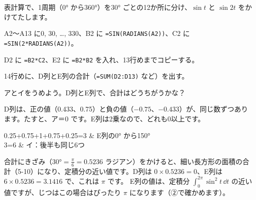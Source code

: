 \begin{yattemiyou}
表計算で、1周期（0° から360°）を30° ごとの12か所に分け、$\sin t$ と $\sin2t$ をかけてたします。
\begin{enumerate}[label={\bkcircled[bkGreen]{\arabic*}}, leftmargin=2.4\zw, itemsep=0pt, topsep=2pt]
\item A2〜A13 に0, 30, …, 330、B2 に \texttt{=SIN(RADIANS(A2))}、C2 に \texttt{=SIN(2*RADIANS(A2))}。
\item D2 に \texttt{=B2*C2}、E2 に \texttt{=B2*B2} を入れ、13行めまでコピーする。
\item 14行めに、D列とE列の合計（\texttt{=SUM(D2:D13)} など）を出す。
\end{enumerate}
\begin{bkcenter}
\end{bkcenter}
アとイをうめよう。D列とE列で、合計はどうちがうかな？
\end{yattemiyou}

\noindent D列は、正の値（0.433、0.75）と負の値（$-0.75$、$-0.433$）が、同じ数ずつあります。たすと、ア＝0 です。E列は2乗なので、どれも0以上です。
\begin{bkhenkei}[0.56]
0.25+0.75+1+0.75+0.25=3 & E列の0° から150° \\
3=6 & イ：後半も同じ6つ \\
\end{bkhenkei}
合計にきざみ（$30°=\frac{\pi}{6}=0.5236$ ラジアン）をかけると、細い長方形の面積の合計（5-10）になり、定積分の近い値です。D列は $0\times0.5236=0$、E列は $6\times0.5236=3.1416$ で、これは $\pi$ です。
E列の値は、定積分 $\int_0^{2\pi}\sin^2t\,\dd t$ の近い値ですが、じつはこの場合はぴったり $\pi$ になります（②で確かめます）。

